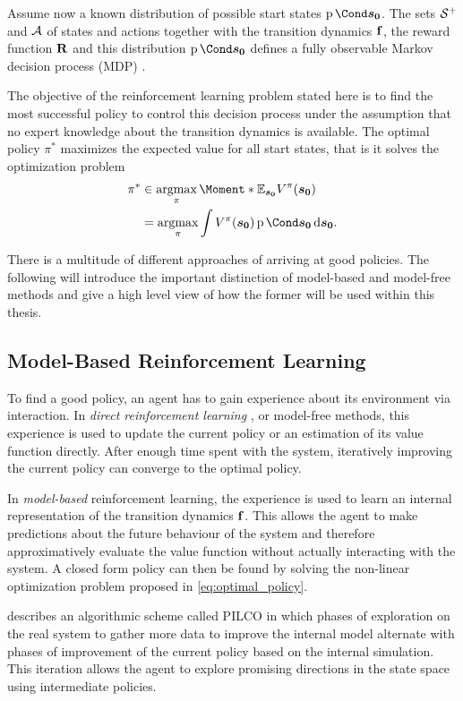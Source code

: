 Assume now a known distribution of possible start states $\Prob{\rv{s_0}}$.
The sets $\mathcal{S}^+$ and $\mathcal{A}$ of states and actions together with the transition dynamics $\operatorname{\mathbf{f}}$, the reward function $\operatorname{\mathbf{R}}$ and this distribution $\Prob{\rv{s_0}}$ defines a fully observable Markov decision process (MDP) \cite{sutton_reinforcement_1998,murphy_machine_2012}.

The objective of the reinforcement learning problem stated here is to find the most successful policy to control this decision process under the assumption that no expert knowledge about the transition dynamics is available.
The optimal policy $\pi^*$ maximizes the expected value for all start states, that is it solves the optimization problem
\begin{align}
    \label{eq:optimal_policy}
    \pi^* &\in \argmax_{\pi} \Moment*{\E_{\rv{s_0}}}{V^\pi(\rv{s_0})} \\
    &= \argmax_{\pi} \int V^\pi(\rv{s_0}) \Prob{\rv{s_0}} \diff \rv{s_0}.
\end{align}

There is a multitude of different approaches of arriving at good policies.
The following will introduce the important distinction of model-based and model-free methods and give a high level view of how the former will be used within this thesis.

\subsection{Model-Based Reinforcement Learning}
To find a good policy, an agent has to gain experience about its environment via interaction.
In \emph{direct reinforcement learning} \cite{sutton_reinforcement_1998}, or model-free methods, this experience is used to update the current policy or an estimation of its value function directly.
After enough time spent with the system, iteratively improving the current policy can converge to the optimal policy.

In \emph{model-based} reinforcement learning, the experience is used to learn an internal representation of the transition dynamics $\operatorname{\mathbf{f}}$.
This allows the agent to make predictions about the future behaviour of the system and therefore approximatively evaluate the value function without actually interacting with the system.
A closed form policy can then be found by solving the non-linear optimization problem proposed in \cref{eq:optimal_policy}.

\citeauthor{deisenroth_efficient_2010} \cite{deisenroth_efficient_2010} describes an algorithmic scheme called PILCO in which phases of exploration on the real system to gather more data to improve the internal model alternate with phases of improvement of the current policy based on the internal simulation.
This iteration allows the agent to explore promising directions in the state space using intermediate policies.

